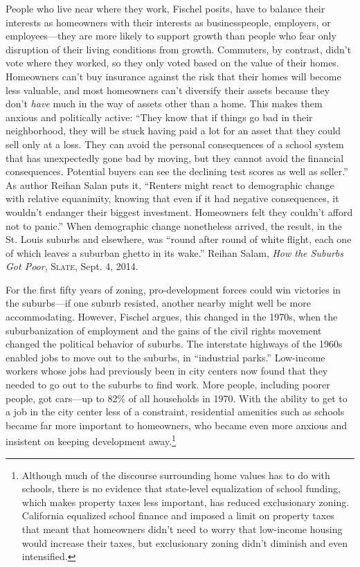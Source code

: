 People who live near where they work, Fischel posits, have to balance their
interests as homeowners with their interests as businesspeople, employers, or
employees---they are more likely to support growth than people who fear only
disruption of their living conditions from growth. Commuters, by contrast,
didn't vote where they worked, so they only voted based on the value of their
homes. Homeowners can't buy insurance against the risk that their homes will
become less valuable, and most homeowners can't diversify their assets because
they don't \textit{have} much in the way of assets other than a home. This makes
them anxious and politically active: ``They know that if things go bad in their
neighborhood, they will be stuck having paid a lot for an asset that they could
sell only at a loss. They can avoid the personal consequences of a school system
that has unexpectedly gone bad by moving, but they cannot avoid the financial
consequences. Potential buyers can see the declining test scores as well as
seller.'' As author Reihan Salan puts it, ``Renters might react to demographic
change with relative equanimity, knowing that even if it had negative
consequences, it wouldn't endanger their biggest investment. Homeowners felt
they couldn't afford not to panic.'' When demographic change nonetheless
arrived, the result, in the St. Louis suburbs and elsewhere, was ``round after
round of white flight, each one of which leaves a suburban ghetto in its wake.''
Reihan Salam, \textit{How the Suburbs Got Poor}, \textsc{Slate}, Sept. 4, 2014.

For the first fifty years of zoning, pro-development forces could win victories
in the suburbs---if one suburb resisted, another nearby might well be more
accommodating. However, Fischel argues, this changed in the 1970s, when the
suburbanization of employment and the gains of the civil rights movement changed
the political behavior of suburbs. The interstate highways of the 1960s enabled
jobs to move out to the suburbs, in ``industrial parks.'' Low-income workers
whose jobs had previously been in city centers now found that they needed to go
out to the suburbs to find work. More people, including poorer people, got
cars---up to 82\% of all households in 1970. With the ability to get to a job in
the city center less of a constraint, residential amenities such as schools
became far more important to homeowners, who became even more anxious and
insistent on keeping development away.\footnote{ Although much of the discourse
surrounding home values has to do with schools, there is no evidence that
state-level equalization of school funding, which makes property taxes less
important, has reduced exclusionary zoning. California equalized school finance
and imposed a limit on property taxes that meant that homeowners didn't need to
worry that low-income housing would increase their taxes, but exclusionary
zoning didn't diminish and even intensified.}

